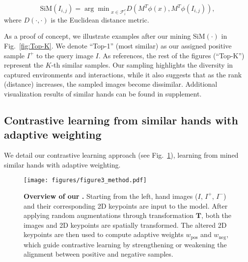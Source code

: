 \begin{equation}
\label{eq:mining} 
    \mathrm{SiM} (I_{i,j}) = {\arg \min} _{x \in \mathcal{F}^{c}_{i}} D(M^{T} \phi(x), M^{T} \phi(I_{i,j})),
\end{equation}
where $D(\cdot,\cdot)$ is the Euclidean distance metric. 

As a proof of concept, we illustrate examples after our mining $\mathrm{SiM}(\cdot)$ in Fig.~\ref{fig:Top-K}. We denote ``Top-1'' (most similar) as our assigned positive sample $I^+$ to the query image $I$. As references, the rest of the figures (``Top-K'') represent the $K$-th similar samples. Our sampling highlights the diversity in captured environments and interactions, while it also suggests that as the rank (distance) increases, the sampled images become dissimilar. Additional visualization results of similar hands can be found in supplement.


\subsection{
{Contrastive learning from similar hands with adaptive weighting}}\label{sec:method_contras}
{
We detail our contrastive learning approach (see Fig.~\ref{fig:method}), learning from mined similar hands with adaptive weighting.}

\begin{figure}[t!]
\vspace{-2mm}
    \begin{center}
    \texttt{[image: figures/figure3\_method.pdf]}
    \end{center}
    \vspace{-3mm}
    \caption{
    \textbf{Overview of our \Ours.} Starting from the left, hand images ($I$, $I^{+}$, $I^{-}$) and their corresponding 2D keypoints are input to the model. After applying random augmentations through transformation \( \mathbf {T} \), both the images and 2D keypoints are spatially transformed. The altered 2D keypoints are then used to compute adaptive weights  \( w_{\text{pos}} \) and  \( w_{\text{neg}} \), which guide contrastive learning by strengthening or weakening the alignment between positive and negative samples.
   }
    \label{fig:method}
    \vspace{-5mm}
\end{figure}

